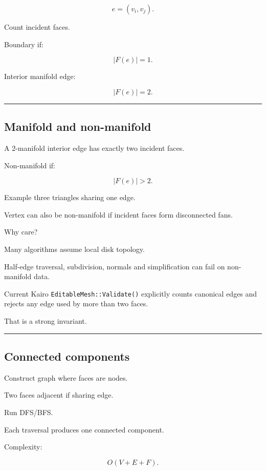 \[
e=(v_i,v_j).
\]

Count incident faces.

Boundary if:

\[
\boxed{
|F(e)|=1.
}
\]

Interior manifold edge:

\[
|F(e)|=2.
\]

\begin{center}\rule{0.5\linewidth}{0.5pt}\end{center}

\subsection{Manifold and non-manifold}\label{04-visual-computing-ii-ch041-manifold-and-non-manifold}

A 2-manifold interior edge has exactly two incident faces.

Non-manifold if:

\[
|F(e)|>2.
\]

Example three triangles sharing one edge.

Vertex can also be non-manifold if incident faces form disconnected fans.

Why care?

Many algorithms assume local disk topology.

Half-edge traversal, subdivision, normals and simplification can fail on non-manifold data.

Current Kairo \texttt{EditableMesh::Validate()} explicitly counts canonical edges and rejects any edge used by more than two faces.

That is a strong invariant.

\begin{center}\rule{0.5\linewidth}{0.5pt}\end{center}

\subsection{Connected components}\label{04-visual-computing-ii-ch041-connected-components}

Construct graph where faces are nodes.

Two faces adjacent if sharing edge.

Run DFS/BFS.

Each traversal produces one connected component.

Complexity:

\[
O(V+E+F).
\]

